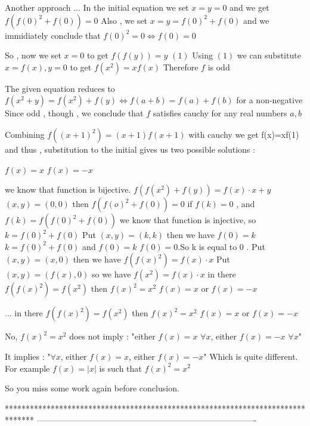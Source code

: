 \begin{solution}
	Another approach ...
In the initial equation we set $x=y=0$ and we get $f(f(0)^{2}+f(0))=0$ 
Also , we set $x=y=f(0)^{2}+f(0)$ and we immidiately conclude that $f(0)^2=0\Leftrightarrow f(0)=0$

So , now we set $x=0$ to get $f(f(y))=y$        $(1)$
Using $(1)$ we can substitute $x=f(x), y=0$ to get $f(x^2)=xf(x)$
Therefore $f$ is odd 

The given equation reduces to 
$f(x^{2}+y)=f(x^{2})+f(y)\Leftrightarrow f(a+b)=f(a)+f(b) $ for a non-negative 
Since odd , though , we conclude that $f$ satisfies cauchy for any real numbers $a,b$

Combining $f((x+1)^2)=(x+1)f(x+1)$ with cauchy we get f(x)=xf(1)
and thus , substitution to the initial gives us two possible solutions :

$f(x)=x$
$f(x)=-x$
\end{solution}



\begin{solution}
	we know that function is bijective.
$  f(f(x^2) + f(y)) = f(x) \cdot x +y  $
$  (x,y) = (0,0) $ then  $ f(f(o)^2 + f(0)) =0 $
if $ f(k)= 0 $ , and $ f(k) = f(f(0)^2 + f(0)) $ we know that function is injective, so  $ k= f(0)^2 + f(0)  $
Put $ (x,y) = (k,k) $ then we have  $ f(0) = k $ 
 $ k= f(0)^2 + f(0)  $ and  $ f(0) =k $
$ f(0)= 0 $.So k is equal to 0 .
    Put $ (x,y) = (x,0) $ then we have 
$ f(f(x)^2)= f(x) \cdot x $  
    Put    $ (x,y) =(f(x) ,0) $ so we have $ f(x^2)= f(x) \cdot x $
in there $ f(f(x)^2) = f(x^2) $  then   $ f(x)^2 = x^2  $ 
$ f(x) = x $ or $ f(x) =-x $
\end{solution}



\begin{solution}
	\begin{tcolorbox}...
in there $ f(f(x)^2) = f(x^2) $  then   $ f(x)^2 = x^2  $ 
$ f(x) = x $ or $ f(x) =-x $\end{tcolorbox}
No, $f(x)^2=x^2$ does not imply : "either $f(x)=x$ $\forall x$, either $f(x)=-x$ $\forall x$"

It implies : "$\forall x$, either $f(x)=x$, either $f(x)=-x$"
Which is quite different. For example $f(x)=|x|$ is such that $f(x)^2=x^2$

So you miss some work again before conclusion.
\end{solution}
*******************************************************************************
-------------------------------------------------------------------------------


